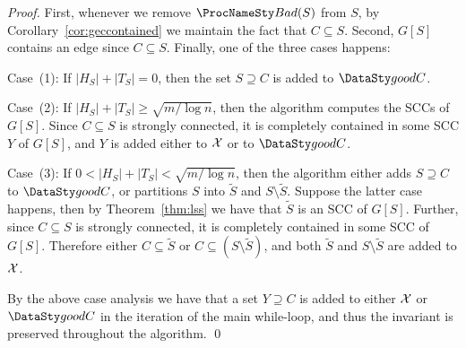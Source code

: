 \begin{proof}
First, whenever we remove $\bad(S)$ from $S$, by Corollary~\ref{cor:geccontained}
we maintain the fact that $C \subseteq S$. Second, $G[S]$ contains an edge since $C \subseteq S$.
Finally, one of the three cases happens:

\smallskip\noindent Case~(1): If $\lvert H_S \rvert + \lvert T_S \rvert = 0$, then the set
$S \supseteq C$ is added to $\goodC$.

\smallskip\noindent Case~(2): If $\lvert H_S \rvert + \lvert T_S \rvert \ge \sqrt{m / \log n}$,
then the algorithm computes the SCCs of $G[S]$. Since $C \subseteq S$ is strongly connected,
it is completely contained in some SCC $Y$ of $G[S]$, and $Y$ is added either to
$\mathcal{X}$ or to $\goodC$.

\smallskip\noindent Case~(3): If $0 < \lvert H_S \rvert + \lvert T_S \rvert < \sqrt{m / \log n}$,
then the algorithm either adds $S \supseteq C$ to $\goodC$, or partitions $S$
into $\tilde{S}$ and $S \setminus \tilde{S}$. Suppose the latter case happens, then by
Theorem~\ref{thm:lss} we have that $\tilde{S}$ is an SCC of $G[S]$. Further, since $C \subseteq S$
is strongly connected, it is completely contained in some SCC of $G[S]$.
Therefore either $C \subseteq \tilde{S}$ or $C \subseteq (S \setminus \tilde{S})$, and
both $\tilde{S}$ and $S \setminus \tilde{S}$ are added to $\mathcal{X}$.

\smallskip\noindent By the above case analysis we have that a set $Y \supseteq C$ is added
to either $\mathcal{X}$ or $\goodC$ in the iteration of the main while-loop, and thus
the invariant is preserved throughout the algorithm.
\qed

\end{proof}

